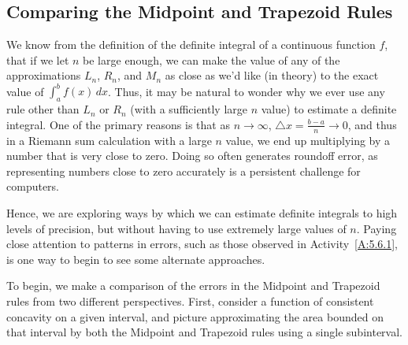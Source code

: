 


\subsection*{Comparing the Midpoint and Trapezoid Rules}

We know from the definition of the definite integral of a continuous function $f$, that if we let $n$ be large enough, we can make the value of any of the approximations $L_n$, $R_n$, and $M_n$ as close as we'd like (in theory) to the exact value of $\int_a^b f(x) \, dx$.  Thus, it may be natural to wonder why we ever use any rule other than $L_n$ or $R_n$ (with a sufficiently large $n$ value) to estimate a definite integral.  One of the primary reasons is that as $n \to \infty$, $\triangle x = \frac{b-a}{n} \to 0$, and thus in a Riemann sum calculation with a large $n$ value, we end up multiplying by a number that is very close to zero.  Doing so often generates roundoff error, as representing numbers close to zero accurately is a persistent challenge for computers.

Hence, we are exploring ways by which we can estimate definite integrals to high levels of precision, but without having to use extremely large values of $n$.  Paying close attention to patterns in errors, such as those observed in Activity~\ref{A:5.6.1}, is one way to begin to see some alternate approaches.

To begin, we make a comparison of the errors in the Midpoint and Trapezoid rules from two different perspectives.  First, consider a function of consistent concavity on a given interval, and picture approximating the area bounded on that interval by both the Midpoint and Trapezoid rules using a single subinterval.

